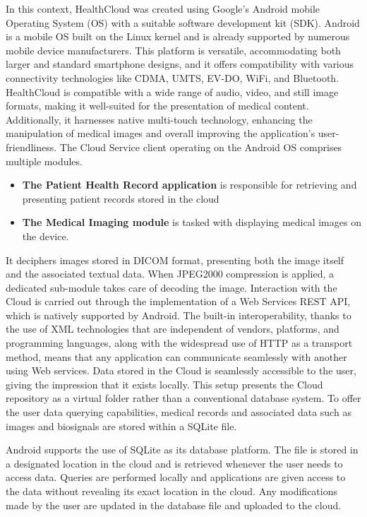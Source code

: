 \documentclass{article}
\begin{document}
In this context, HealthCloud was created using Google's Android mobile Operating System (OS) with a suitable software development kit (SDK). Android is a mobile OS built on the Linux kernel and is already supported by numerous mobile device manufacturers. This platform is versatile, accommodating both larger and standard smartphone designs, and it offers compatibility with various connectivity technologies like CDMA,  UMTS, EV-DO, WiFi, and Bluetooth. HealthCloud is compatible with a wide range of audio, video, and still image formats, making it well-suited for the presentation of medical content. Additionally, it harnesses native multi-touch technology, enhancing the manipulation of medical images and overall improving the application's user-friendliness.
The Cloud Service client operating on the Android OS comprises multiple modules. 
\begin{itemize}
    \item \textbf{The Patient Health Record application} is responsible for retrieving and presenting patient records stored in the cloud
    \item \textbf{The Medical Imaging module} is tasked with displaying medical images on the device.
\end{itemize}

It deciphers images stored in DICOM format, presenting both the image itself and the associated textual data. When JPEG2000 compression is applied, a dedicated sub-module takes care of decoding the image. Interaction with the Cloud is carried out through the implementation of a Web Services REST API, which is natively supported by Android. The built-in interoperability, thanks to the use of XML technologies that are independent of vendors, platforms, and programming languages, along with the widespread use of HTTP as a transport method, means that any application can communicate seamlessly with another using Web services. Data stored in the Cloud is seamlessly accessible to the user, giving the impression that it exists locally. This setup presents the Cloud repository as a virtual folder rather than a conventional database system. To offer the user data querying capabilities, medical records and associated data such as images and biosignals are stored within a SQLite file.

Android supports the use of SQLite as its database platform. The file is stored in a designated location in the cloud and is retrieved whenever the user needs to access data. Queries are performed locally and applications are given access to the data without revealing its exact location in the cloud. Any modifications made by the user are updated in the database file and uploaded to the cloud.
\end{document}
